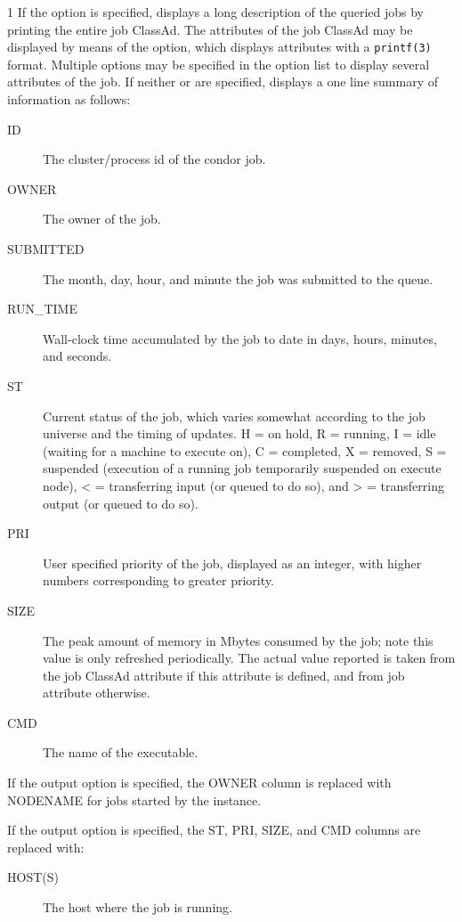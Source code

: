 \begin{ManPage}{\label{man-condor-q}}{1}
If the  option is specified,  displays a long description 
of the queried jobs by printing the entire job ClassAd.
The attributes of the job ClassAd may be displayed by means of the
 option, which displays attributes with a \verb+printf(3)+
format.
Multiple  options may be specified in the option list to display
several attributes of the job.
If neither  or  are specified,  displays a 
one line summary of information as follows:

\begin{description}
\item[ID] The cluster/process id of the condor job. 
\item[OWNER] The owner of the job. 
\item[SUBMITTED] The month, day, hour, and minute the job was submitted to the 
	queue. 
\item[RUN\_TIME]  Wall-clock time accumulated by the job to date in days, 
	hours, minutes, and seconds.  
\item[ST] Current status of the job, which varies somewhat according
        to the job universe and the timing of updates.
        H = on hold,
        R = running,
	I = idle
        (waiting for a machine to execute on), C = completed, 
        X = removed,
		S = suspended (execution of a running job temporarily suspended on execute node),
        < = transferring input (or queued to do so), and
        > = transferring output (or queued to do so). 
\item[PRI] User specified priority of the job, displayed as an integer, with 
	higher numbers corresponding to greater priority. 
\item[SIZE] The peak amount of memory in Mbytes consumed by the job; note
	this value is only refreshed periodically.  The actual value reported is
	taken from the job ClassAd attribute  if this attribute
	is defined, and from job attribute  otherwise.
\item[CMD] The name of the executable. 
\end{description}

If the output option  is specified, the OWNER column is replaced
with NODENAME for jobs started by the  instance.

If the output option  is specified, the ST, PRI, SIZE, and CMD
columns are replaced with:

\begin{description}
\item[HOST(S)] The host where the job is running.
\end{description}


\end{ManPage}
